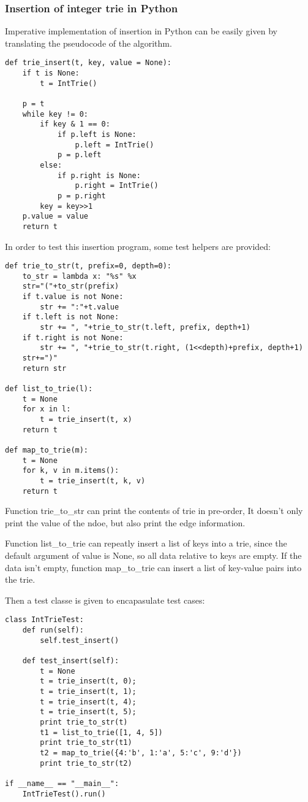 \documentclass{article}
\begin{document}
\subsubsection*{Insertion of integer trie in Python}
Imperative implementation of insertion in Python can be easily given by translating
the pseudocode of the algorithm.

\lstset{language=Python}
\begin{lstlisting}
def trie_insert(t, key, value = None):
    if t is None:
        t = IntTrie()

    p = t
    while key != 0:
        if key & 1 == 0:
            if p.left is None:
                p.left = IntTrie()
            p = p.left
        else:
            if p.right is None:
                p.right = IntTrie()
            p = p.right
        key = key>>1
    p.value = value
    return t
\end{lstlisting}

In order to test this insertion program, some test helpers are provided:

\begin{lstlisting}
def trie_to_str(t, prefix=0, depth=0):
    to_str = lambda x: "%s" %x
    str="("+to_str(prefix)
    if t.value is not None:
        str += ":"+t.value
    if t.left is not None:
        str += ", "+trie_to_str(t.left, prefix, depth+1)
    if t.right is not None:
        str += ", "+trie_to_str(t.right, (1<<depth)+prefix, depth+1)
    str+=")"
    return str

def list_to_trie(l):
    t = None
    for x in l:
        t = trie_insert(t, x)
    return t

def map_to_trie(m):
    t = None
    for k, v in m.items():
        t = trie_insert(t, k, v)
    return t
\end{lstlisting}

Function trie\_to\_str can print the contents of trie in pre-order,
It doesn't only print the value of the ndoe, but also print the edge information.

Function list\_to\_trie can repeatly insert a list of keys into a trie, since the
default argument of value is None, so all data relative to keys are empty. If the
data isn't empty, function map\_to\_trie can insert a list of key-value pairs into 
the trie.

Then a test classe is given to encapasulate test cases:

\begin{lstlisting}
class IntTrieTest:
    def run(self):
        self.test_insert()

    def test_insert(self):
        t = None
        t = trie_insert(t, 0);
        t = trie_insert(t, 1);
        t = trie_insert(t, 4);
        t = trie_insert(t, 5);
        print trie_to_str(t)
        t1 = list_to_trie([1, 4, 5])
        print trie_to_str(t1)
        t2 = map_to_trie({4:'b', 1:'a', 5:'c', 9:'d'})
        print trie_to_str(t2)

if __name__ == "__main__":
    IntTrieTest().run()
\end{lstlisting}
\end{document}
